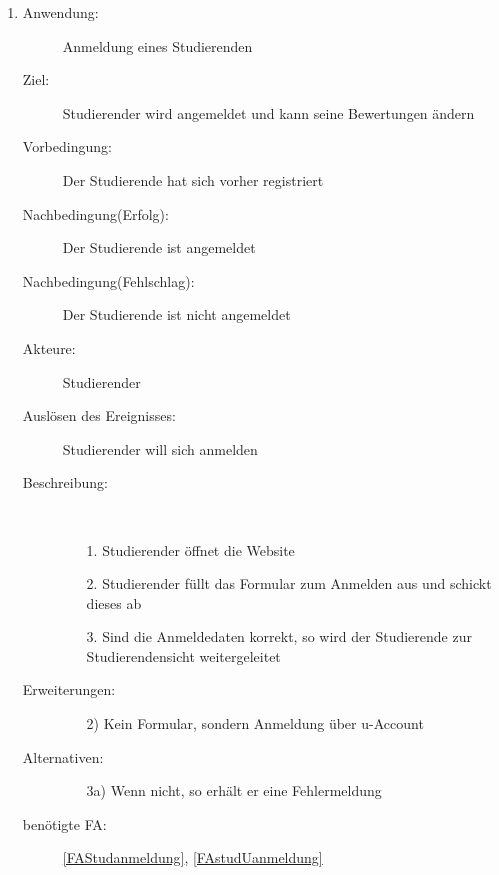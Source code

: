 \documentclass[parskip=full]{scrartcl}
\newcommand{\swtLabel}[1]{\textbf{/#1\arabic*0/}}
\begin{document}
\begin{enumerate}[label=\swtLabel{S}]
  \item \label{UCstudAnmeldung}
    \begin{description}
    \item[Anwendung:] Anmeldung eines Studierenden
    \item[Ziel:] Studierender wird angemeldet und kann seine Bewertungen ändern
  	\item[Vorbedingung:] Der Studierende hat sich vorher registriert
  	\item[Nachbedingung(Erfolg):] Der Studierende ist angemeldet
  	\item[Nachbedingung(Fehlschlag):] Der Studierende ist nicht angemeldet
  	\item[Akteure:] Studierender
  	\item[Auslösen des Ereignisses:] Studierender will sich anmelden
  	\item[Beschreibung:]~
  	\begin{enumerate}
  	  \item[1.] Studierender öffnet die Website
  	  \item[2.] Studierender füllt das Formular zum Anmelden aus und schickt
  	  dieses ab %
  	  \item[3.] Sind die Anmeldedaten korrekt, so wird der Studierende zur
  	  Studierendensicht weitergeleitet
  	\end{enumerate}
  	\item[Erweiterungen:]
  	\begin{enumerate}
  	  \item[2)] Kein Formular, sondern Anmeldung über u-Account
  	\end{enumerate}    	
  	\item[Alternativen:]
	\begin{enumerate}
  	  \item[3a)] Wenn nicht, so erhält er eine Fehlermeldung
  	\end{enumerate}
  	\item[benötigte FA:] \ref{FAStudanmeldung}, \ref{FAstudUanmeldung}
  \end{description}
   

\end{enumerate}
\end{document}
